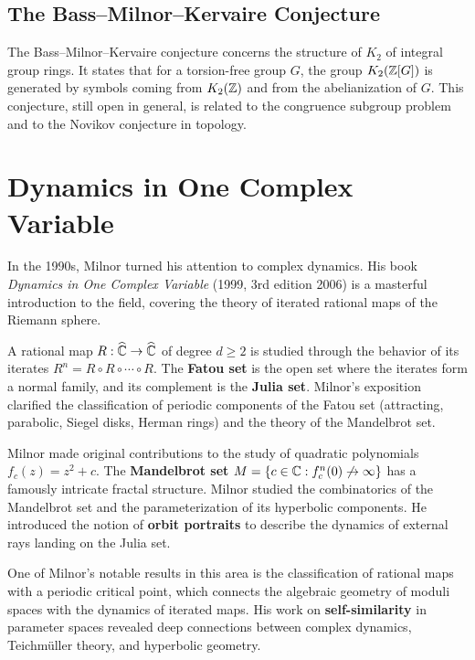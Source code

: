 \subsection{The Bass--Milnor--Kervaire Conjecture}

The Bass--Milnor--Kervaire conjecture concerns the structure of \(K_2\) of integral group rings. It states that for a torsion-free group \(G\), the group \(K_2(\mathbb{Z}[G])\) is generated by symbols coming from \(K_2(\mathbb{Z})\) and from the abelianization of \(G\). This conjecture, still open in general, is related to the congruence subgroup problem and to the Novikov conjecture in topology.

\section{Dynamics in One Complex Variable}

In the 1990s, Milnor turned his attention to complex dynamics. His book \textit{Dynamics in One Complex Variable} (1999, 3rd edition 2006) is a masterful introduction to the field, covering the theory of iterated rational maps of the Riemann sphere.

A rational map \(R: \widehat{\mathbb{C}} \to \widehat{\mathbb{C}}\) of degree \(d \geq 2\) is studied through the behavior of its iterates \(R^n = R \circ R \circ \cdots \circ R\). The \textbf{Fatou set} is the open set where the iterates form a normal family, and its complement is the \textbf{Julia set}. Milnor's exposition clarified the classification of periodic components of the Fatou set (attracting, parabolic, Siegel disks, Herman rings) and the theory of the Mandelbrot set.

Milnor made original contributions to the study of quadratic polynomials \(f_c(z) = z^2 + c\). The \textbf{Mandelbrot set} \(M = \{c \in \mathbb{C} : f_c^n(0) \not\to \infty\}\) has a famously intricate fractal structure. Milnor studied the combinatorics of the Mandelbrot set and the parameterization of its hyperbolic components. He introduced the notion of \textbf{orbit portraits} to describe the dynamics of external rays landing on the Julia set.

One of Milnor's notable results in this area is the classification of rational maps with a periodic critical point, which connects the algebraic geometry of moduli spaces with the dynamics of iterated maps. His work on \textbf{self-similarity} in parameter spaces revealed deep connections between complex dynamics, Teichm\"uller theory, and hyperbolic geometry.

